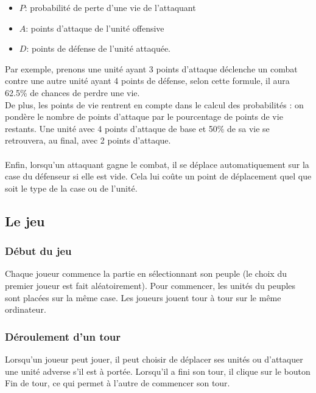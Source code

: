 \bigskip
\begin{itemize}
  \item \ensuremath{P}: probabilité de perte d'une vie de l'attaquant
  \item \ensuremath{A}: points d'attaque de l'unité offensive
  \item \ensuremath{D}: points de défense de l'unité attaquée.
\end{itemize}
\bigskip

Par exemple, prenons une unité ayant 3 points d'attaque déclenche un combat contre une autre unité ayant 4 points de défense, selon cette formule, il aura 62.5\% de chances de perdre une vie.\\

De plus, les points de vie rentrent en compte dans le calcul des probabilités : on pondère le nombre de points d'attaque par le pourcentage de points de vie restants. Une unité avec 4 points d'attaque de base et 50\% de sa vie se retrouvera, au final, avec 2 points d'attaque.\\\\
Enfin, lorsqu'un attaquant gagne le combat, il se déplace automatiquement sur la case du défenseur si elle est vide. Cela lui coûte un point de déplacement quel que soit le type de la case ou de l'unité.

\subsection{Le jeu}
\subsubsection{Début du jeu}
Chaque joueur commence la partie en sélectionnant son peuple (le choix du premier joueur est fait aléatoirement). Pour commencer, les unités du peuples sont placées sur la même case. Les joueurs jouent tour à tour sur le même ordinateur.
\subsubsection{Déroulement d'un tour}
Lorsqu'un joueur peut jouer, il peut choisir de déplacer ses unités ou d'attaquer une unité adverse s'il est à portée. Lorsqu'il a fini son tour, il clique sur le bouton Fin de tour, ce qui permet à l'autre de commencer son tour.
